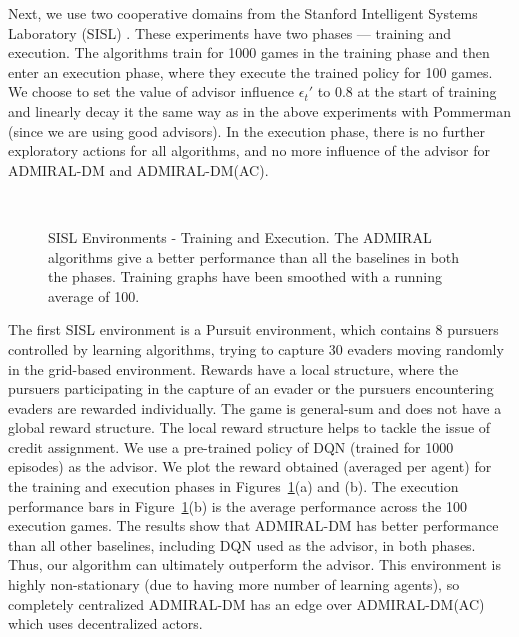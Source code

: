 \documentclass[jair, twoside,11pt,theapa]{article}
\begin{document}
Next, we use two cooperative domains from the Stanford Intelligent Systems Laboratory (SISL) \citep{gupta2017cooperative}. These experiments  have two phases --- training and execution. The algorithms train for 1000 games in the training phase and then enter an execution phase, where they execute the trained policy for 100 games. We choose to set the value of advisor influence $\epsilon_t'$ to 0.8 at the start of training and linearly decay it the same way as in the above experiments with Pommerman (since we are using good advisors). In the execution phase, there is no further exploratory actions for all algorithms, and no more influence of the advisor for ADMIRAL-DM and ADMIRAL-DM(AC).

\begin{figure}[h]
    \centering
	\\
	
  \caption{SISL Environments - Training and Execution. The ADMIRAL algorithms give a better performance than all the baselines in both the phases. Training graphs have been smoothed with a running average of 100. 
  }%
	\label{fig:pettingzoo}
\end{figure}

The first SISL environment is a Pursuit environment, which contains 8 pursuers controlled by learning algorithms, trying to capture 30 evaders moving randomly in the grid-based environment. Rewards have a local structure, where the pursuers participating in the capture of an evader or the pursuers encountering evaders are rewarded individually. The game is general-sum and does not have a global reward structure. The local reward structure helps to tackle the issue of credit assignment.
We use a pre-trained policy of DQN (trained for 1000 episodes) as the advisor. We plot the reward obtained (averaged per agent) for the training and execution phases in Figures~\ref{fig:pettingzoo}(a) and (b). The execution performance bars in Figure~\ref{fig:pettingzoo}(b) is the average performance across the 100 execution games. The results show that ADMIRAL-DM has  better performance than all other baselines, including DQN used as the advisor, in both phases. Thus, our algorithm can ultimately outperform the advisor. This environment is highly non-stationary (due to having more number of learning agents), so completely centralized ADMIRAL-DM has an edge over ADMIRAL-DM(AC) which uses decentralized actors. 
\end{document}
